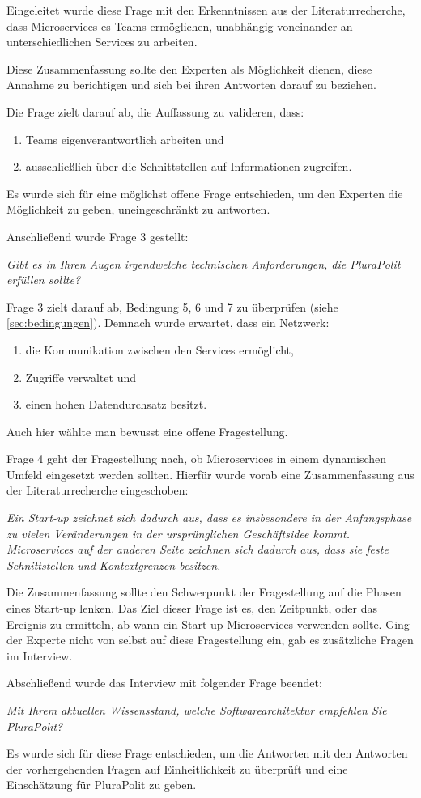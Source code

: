 Eingeleitet wurde diese Frage mit den Erkenntnissen aus der Literaturrecherche, dass Microservices es Teams ermöglichen, unabhängig voneinander an unterschiedlichen Services zu arbeiten.

Diese Zusammenfassung sollte den Experten als Möglichkeit dienen, diese Annahme zu berichtigen und sich bei ihren Antworten darauf zu beziehen.

Die Frage zielt darauf ab, die Auffassung zu valideren, dass:
\begin{enumerate}
	\item Teams eigenverantwortlich arbeiten und
	\item ausschließlich über die Schnittstellen auf Informationen zugreifen.
\end{enumerate}
Es wurde sich für eine möglichst offene Frage entschieden, um den Experten die Möglichkeit zu geben, uneingeschränkt zu antworten.

Anschließend wurde Frage 3 gestellt:

\textit{Gibt es in Ihren Augen irgendwelche technischen Anforderungen, die PluraPolit erfüllen sollte? }

Frage 3 zielt darauf ab, Bedingung 5, 6 und 7 zu überprüfen (siehe \cref{sec:bedingungen}). Demnach wurde erwartet, dass ein Netzwerk: 

\begin{enumerate}
	\item die Kommunikation zwischen den Services ermöglicht,
	\item Zugriffe verwaltet und
	\item einen hohen Datendurchsatz besitzt.
\end{enumerate}

Auch hier wählte man bewusst eine offene Fragestellung.

Frage 4 geht der Fragestellung nach, ob Microservices in einem dynamischen Umfeld eingesetzt werden sollten. Hierfür wurde vorab eine Zusammenfassung aus der Literaturrecherche eingeschoben:

\textit{Ein Start-up zeichnet sich dadurch aus, dass es insbesondere in der Anfangsphase zu vielen Veränderungen in der ursprünglichen Geschäftsidee kommt. Microservices auf der anderen Seite zeichnen sich dadurch aus, dass sie feste Schnittstellen und Kontextgrenzen besitzen.}

Die Zusammenfassung sollte den Schwerpunkt der Fragestellung auf die Phasen eines Start-up lenken. Das Ziel dieser Frage ist es, den Zeitpunkt, oder das Ereignis zu ermitteln, ab wann ein Start-up Microservices verwenden sollte. Ging der Experte nicht von selbst auf diese Fragestellung ein, gab es zusätzliche Fragen im Interview.

Abschließend wurde das Interview mit folgender Frage beendet:

\textit{Mit Ihrem aktuellen Wissensstand, welche Softwarearchitektur empfehlen Sie PluraPolit?}

Es wurde sich für diese Frage entschieden, um die Antworten mit den Antworten der vorhergehenden Fragen auf Einheitlichkeit zu überprüft und eine Einschätzung für PluraPolit zu geben.
